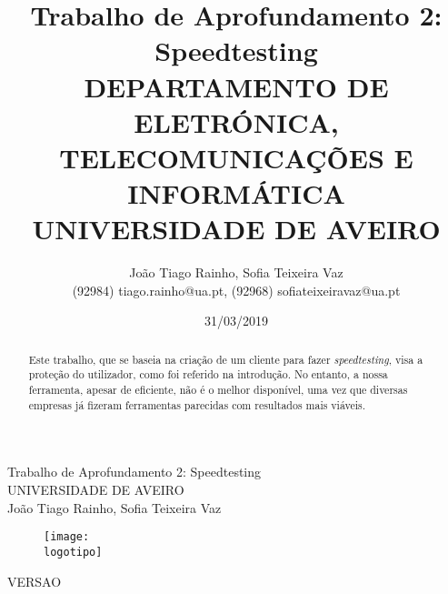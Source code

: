 \documentclass{report}
\begin{document}
%
\def\titulo{Trabalho de Aprofundamento 2: Speedtesting}
\def\data{31/03/2019}
\def\autores{João Tiago Rainho, Sofia Teixeira Vaz}
\def\autorescontactos{(92984) tiago.rainho@ua.pt, (92968) sofiateixeiravaz@ua.pt}
\def\versao{VERSAO}
\def\departamento{DEPARTAMENTO DE ELETRÓNICA, TELECOMUNICAÇÕES E INFORMÁTICA}
\def\empresa{UNIVERSIDADE DE AVEIRO}
\def\logotipo{ua.pdf}
%
%
\begin{titlepage}

\begin{center}
%
\vspace*{50mm}
%
{\Huge \titulo}\\ 
%
\vspace{10mm}
%
{\Large \empresa}\\
%
\vspace{10mm}
%
{\LARGE \autores}\\ 
%
\vspace{30mm}
%
\begin{figure}[h]
\center
\texttt{[image: \\logotipo]}
\end{figure}
%
\vspace{30mm}
\end{center}
%
\begin{flushright}
\versao
\end{flushright}
\end{titlepage}

\title{%
{\Huge\textbf{\titulo}}\\
{\Large \departamento\\ \empresa}
}
%
\author{%
    \autores \\
    \autorescontactos
}
%
\date{\data}
%
\maketitle


\begin{abstract}
Este trabalho, que se baseia na criação de um cliente para fazer \textit{speedtesting}, visa a proteção do utilizador, como foi referido na introdução. No entanto, a nossa ferramenta, apesar de eficiente, não é o melhor disponível, uma vez que diversas empresas já fizeram ferramentas parecidas com resultados mais viáveis.
\end{abstract}

\end{document}
